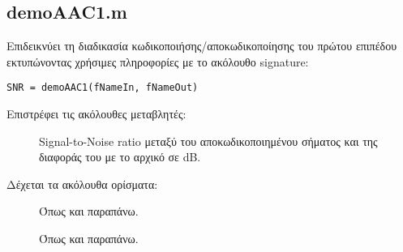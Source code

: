 

\subsection*{demoAAC1.m}
Επιδεικνύει τη διαδικασία κωδικοποιήσης/αποκωδικοποίησης του πρώτου επιπέδου
εκτυπώνοντας χρήσιμες πληροφορίες με το ακόλουθο signature:
\begin{center}
	\verb|SNR = demoAAC1(fNameIn, fNameOut)|
\end{center}

\noindent Επιστρέφει τις ακόλουθες μεταβλητές:
\begin{description}
\item[] Signal-to-Noise ratio μεταξύ του αποκωδικοποιημένου σήματος και
	της διαφοράς του με το αρχικό σε dB.
\end{description}

\noindent Δέχεται τα ακόλουθα ορίσματα:
\begin{description}
\item[] Όπως και παραπάνω.
\item[] Όπως και παραπάνω.
\end{description}


